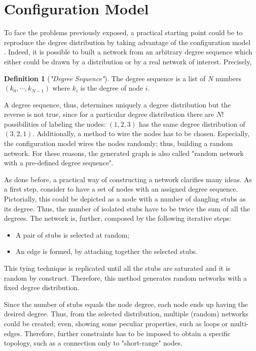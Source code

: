 \documentclass[a4paper,10pt,twoside]{book} %
\theoremstyle{definition}
\newtheorem{definition}{Definition}[section]
\begin{document}
\section{Configuration Model}
To face the problems previously exposed, a practical starting point could be to reproduce the degree distribution by taking advantage of the configuration model 
\cite{Menczer:2020_1stCoursNetSci}. Indeed, it is possible to built a network from an arbitrary degree sequence which either could be drawn by a distribution or by a real network of interest.
Precisely,
\begin{definition}[\textit{"Degree Sequence"}]
	The degree sequence is a list of $N$ numbers \newline $(k_0, \cdots, k_{N-1})$ where $k_i$ is the degree of node $i$.
\end{definition}
A degree sequence, thus, determines uniquely a degree distribution but the reverse is not true, since for a particular degree distribution there are $N!$ possibilities of labeling the nodes: $(1,2,3)$ has the same degree distribution of $(3,2,1)$.
Additionally, a method to wire the nodes has to be chosen. Especially, the configuration model wires the nodes randomly; thus, building a random network. For these reasons, the generated graph is also called "random network with a pre-defined degree sequence". 

As done before, a practical way of constructing a network clarifies many ideas.
As a first step, consider to have a set of nodes with an assigned degree sequence. Pictorially, this could be depicted as a node with a number of dangling stubs as its degree. Thus, the number of isolated stubs have to be twice the sum of all the degrees. 
The network is, further, composed by the following iterative steps:
\begin{itemize}
	\item A pair of stubs is selected at random;
	\item An edge is formed, by attaching together the selected stubs. 
\end{itemize}
This tying technique is replicated until all the stubs are saturated and it is random by construct. Therefore, this method generates random networks with a fixed degree distribution.

Since the number of stubs equals the node degree, each node ends up having the desired degree. Thus, from the selected distribution, multiple (random) networks could be created; even, showing some peculiar properties, such as loops or multi-edges. Therefore, further constraints has to be imposed to obtain a specific topology, such as a connection only to "short-range" nodes. 
\end{document}
